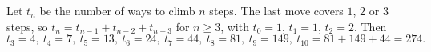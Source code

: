 Let $t_n$ be the number of ways to climb $n$ steps. The last move covers $1$, $2$ or $3$ steps, so $t_n=t_{n-1}+t_{n-2}+t_{n-3}$ for $n\ge3$, with $t_0=1$, $t_1=1$, $t_2=2$. Then
\[t_3=4,\ t_4=7,\ t_5=13,\ t_6=24,\ t_7=44,\ t_8=81,\ t_9=149,\ t_{10}=81+149+44=\boxed{274}.\]

